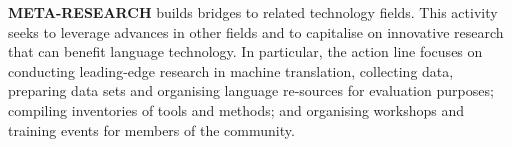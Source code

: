 \documentclass[]{../metanetpaper}
\begin{document}
\begin{multicols}{2}
\textbf{META-RESEARCH} builds bridges to related technology fields. This activity seeks to leverage advances in other fields and to capitalise on innovative research that can benefit language technology. In particular, the action line focuses on conducting leading-edge research in machine translation, collecting data, preparing data sets and organising language re-sources for evaluation purposes; compiling inventories of tools and methods; and organising workshops and training events for members of the community.

\end{multicols}

\cleardoublepage

\appendix
{}



  
\cleardoublepage

\label{metanetmembers}
\end{document}
